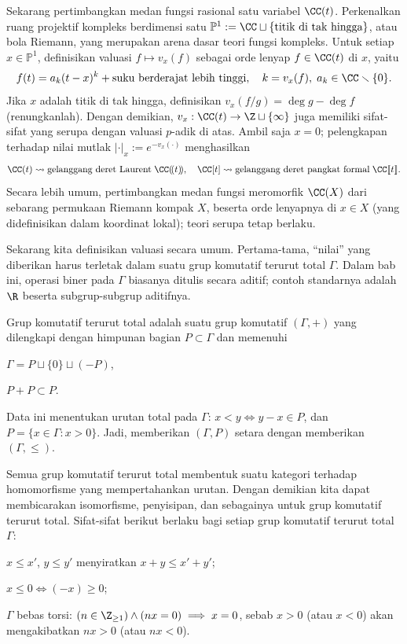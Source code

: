 \begin{example}\label{eg:function-field-valuation} 
	Sekarang pertimbangkan medan fungsi rasional satu variabel $\CC(t)$. Perkenalkan ruang projektif kompleks berdimensi satu $\mathbb{P}^1 := \CC \sqcup \{\text{titik di tak hingga}\}$, atau bola Riemann, yang merupakan arena dasar teori fungsi kompleks. Untuk setiap $x \in \mathbb{P}^1$, definisikan valuasi $f \mapsto v_x(f)$ sebagai orde lenyap $f \in \CC(t)$ di $x$, yaitu
	\[ f(t) = a_k (t - x)^k + \text{suku berderajat lebih tinggi}, \quad k = v_x(f), \; a_k \in \CC \smallsetminus \{0\}. \]
	Jika $x$ adalah titik di tak hingga, definisikan $v_x(f/g) = \deg g - \deg f$ (renungkanlah). Dengan demikian, $v_x: \CC(t) \to \Z \sqcup \{\infty\}$ juga memiliki sifat-sifat yang serupa dengan valuasi $p$-adik di atas. Ambil saja $x=0$; pelengkapan terhadap nilai mutlak $|\cdot|_x := e^{-v_x(\cdot)}$ menghasilkan
	\[ \CC(t) \leadsto \text{gelanggang deret Laurent}\;\CC(\!(t)\!), \quad \CC[t] \leadsto \text{gelanggang deret pangkat formal}\;\CC\llbracket t \rrbracket. \]
	Secara lebih umum, pertimbangkan medan fungsi meromorfik $\CC(X)$ dari sebarang permukaan Riemann kompak $X$, beserta orde lenyapnya di $x \in X$ (yang didefinisikan dalam koordinat lokal); teori serupa tetap berlaku.
\end{example}

Sekarang kita definisikan valuasi secara umum. Pertama-tama, ``nilai'' yang diberikan harus terletak dalam suatu grup komutatif terurut total $\Gamma$. Dalam bab ini, operasi biner pada $\Gamma$ biasanya ditulis secara aditif; contoh standarnya adalah $\R$ beserta subgrup-subgrup aditifnya.
\begin{definition}
	Grup komutatif terurut total adalah suatu grup komutatif $(\Gamma, +)$ yang dilengkapi dengan himpunan bagian $P \subset \Gamma$ dan memenuhi
	\begin{compactitem}
		\item $\Gamma = P \sqcup \{0\} \sqcup (-P)$,
		\item $P + P \subset P$.
	\end{compactitem}
	Data ini menentukan urutan total pada $\Gamma$: $x < y \iff y-x \in P$, dan $P = \{x \in \Gamma: x > 0 \}$. Jadi, memberikan $(\Gamma, P)$ setara dengan memberikan $(\Gamma, \leq)$.
\end{definition}
Semua grup komutatif terurut total membentuk suatu kategori terhadap homomorfisme yang mempertahankan urutan. Dengan demikian kita dapat membicarakan isomorfisme, penyisipan, dan sebagainya untuk grup komutatif terurut total. Sifat-sifat berikut berlaku bagi setiap grup komutatif terurut total $\Gamma$:
\begin{compactitem}
	\item $x \leq x'$, $y \leq y'$ menyiratkan $x+y \leq x'+y'$;
	\item $x \leq 0 \iff (-x) \geq 0$;
	\item $\Gamma$ bebas torsi: $(n \in \Z_{\geq 1}) \wedge (nx=0) \implies x=0$, sebab $x > 0$ (atau $x < 0$) akan mengakibatkan $nx > 0$ (atau $nx < 0$).
\end{compactitem}

